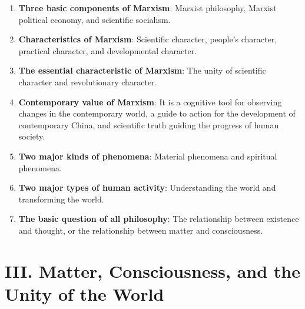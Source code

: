 \documentclass[12pt,a4paper]{ctexart}
\begin{document}
\begin{enumerate}[leftmargin=2em]
    \item \textbf{Three basic components of Marxism}: Marxist philosophy, Marxist political economy, and scientific socialism.
    
    \item \textbf{Characteristics of Marxism}: Scientific character, people's character, practical character, and developmental character.
    
    \item \textbf{The essential characteristic of Marxism}: The unity of scientific character and revolutionary character.
    
    \item \textbf{Contemporary value of Marxism}: It is a cognitive tool for observing changes in the contemporary world, a guide to action for the development of contemporary China, and scientific truth guiding the progress of human society.
    
    \item \textbf{Two major kinds of phenomena}: Material phenomena and spiritual phenomena.
    
    \item \textbf{Two major types of human activity}: Understanding the world and transforming the world.
    
    \item \textbf{The basic question of all philosophy}: The relationship between existence and thought, or the relationship between matter and consciousness.
\end{enumerate}

\section{III. Matter, Consciousness, and the Unity of the World}
\end{document}
